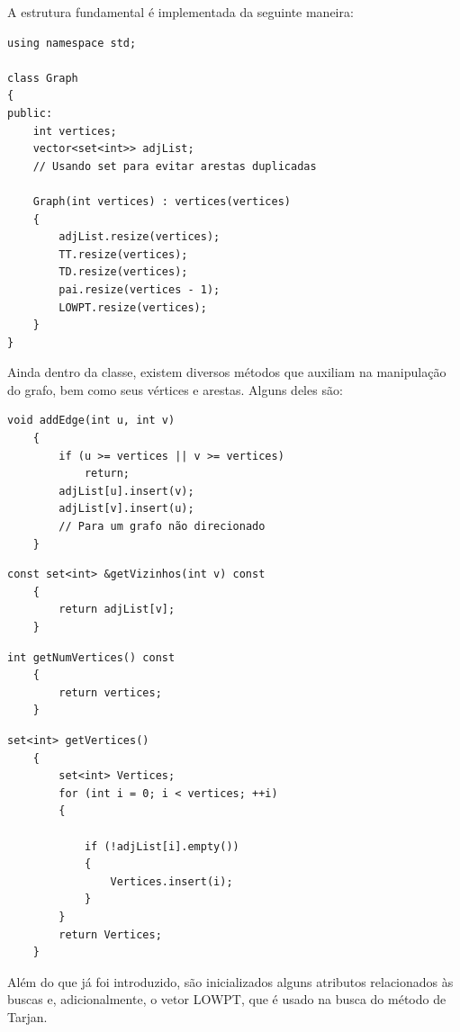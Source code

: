 \documentclass[10pt,conference]{IEEEtran}
\begin{document}
A estrutura fundamental é implementada da seguinte maneira:

\begin{lstlisting}
using namespace std;

class Graph
{
public:
    int vertices;
    vector<set<int>> adjList;
    // Usando set para evitar arestas duplicadas

    Graph(int vertices) : vertices(vertices)
    {
        adjList.resize(vertices);
        TT.resize(vertices);
        TD.resize(vertices);
        pai.resize(vertices - 1);
        LOWPT.resize(vertices);
    }
}
\end{lstlisting}

Ainda dentro da classe, existem diversos métodos que auxiliam na manipulação do grafo, bem como seus vértices e arestas. Alguns deles são:

\begin{lstlisting}[caption={Método para adicionar arestas},captionpos=b]
    void addEdge(int u, int v)
    {
        if (u >= vertices || v >= vertices)
            return;        
        adjList[u].insert(v);
        adjList[v].insert(u);
        // Para um grafo não direcionado
    }
\end{lstlisting}

\newpage

\begin{lstlisting}[caption={Método que retorna a vizinhança de um dado vértice},captionpos=b]
    const set<int> &getVizinhos(int v) const
    {
        return adjList[v];
    }
\end{lstlisting}

\begin{lstlisting}[caption={Retorna número de vértices (N) do grafo},captionpos=b]
    int getNumVertices() const
    {
        return vertices;
    }
    \end{lstlisting}

\begin{lstlisting}[caption={Retorna vetor de vértices do grafo},captionpos=b]
set<int> getVertices()
    {
        set<int> Vertices;
        for (int i = 0; i < vertices; ++i)
        {

            if (!adjList[i].empty())
            {
                Vertices.insert(i);
            }
        }
        return Vertices;
    }
\end{lstlisting}

Além do que já foi introduzido, são inicializados alguns atributos relacionados às buscas e, adicionalmente, o vetor LOWPT, que é usado na busca do método de Tarjan.
\end{document}
